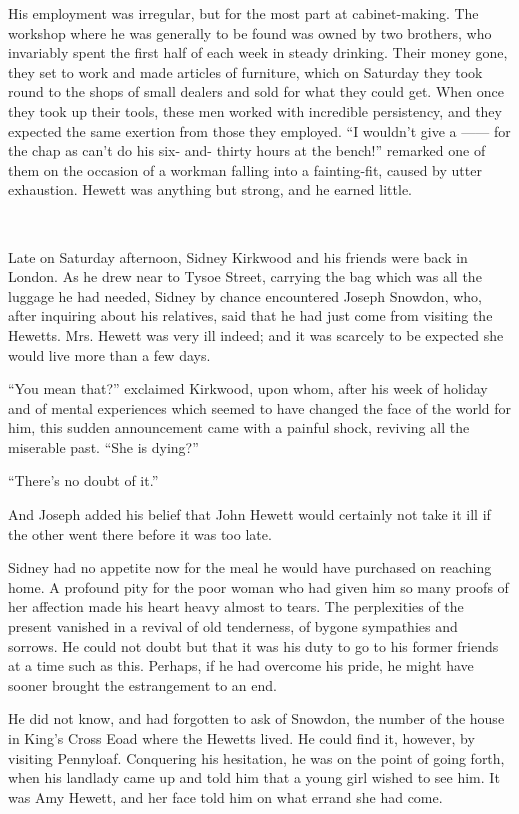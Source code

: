 His employment was irregular, but for the most part at cabinet-making.
The workshop where he was generally to be found was owned by two
brothers, who invariably spent the first half of each week in steady
drinking. Their money gone, they set to work and made articles of
furniture, which on Saturday they took round to the shops of small
dealers {\protect\hypertarget{164}{}{}}and sold for what they could get.
When once they took up their tools, these men worked with incredible
persistency, and they expected the same exertion from those they
employed. ``I wouldn't give {a {{------}}} for the chap as can't do his
six- and- thirty hours at the bench!'' remarked one of them on the
occasion of a workman falling into a fainting-fit, caused by utter
exhaustion. Hewett was anything but strong, and he earned little.

~

Late on Saturday afternoon, Sidney Kirkwood and his friends were back in
London. As he drew near to Tysoe Street, carrying the bag which was all
the luggage he had needed, Sidney by chance encountered Joseph Snowdon,
who, after inquiring about his relatives, said that he had just come
from visiting the Hewetts. Mrs. Hewett was very ill indeed; and it was
scarcely to be expected she would live more than a few days.

``You mean that?'' exclaimed Kirkwood, upon whom, after his week of
holiday and of mental experiences which seemed to have
{\protect\hypertarget{165}{}{}}changed the face of the world for him,
this sudden announcement came with a painful shock, reviving all the
miserable past. ``She is dying?''

``There's no doubt of it.''

And Joseph added his belief that John Hewett would certainly not take it
ill if the other went there before it was too late.

Sidney had no appetite now for the meal he would have purchased on
reaching home. A profound pity for the poor woman who had given him so
many proofs of her affection made his heart heavy almost to tears. The
perplexities of the present vanished in a revival of old tenderness, of
bygone sympathies and sorrows. He could not doubt but that it was his
duty to go to his former friends at a time such as this. Perhaps, if he
had overcome his pride, he might have sooner brought the estrangement to
an end.

He did not know, and had forgotten to ask of Snowdon, the number of the
house in King's Cross Eoad where the Hewetts lived. He could find it,
however, by visiting {\protect\hypertarget{166}{}{}}Pennyloaf.
Conquering his hesitation, he was on the point of going forth, when his
landlady came up and told him that a young girl wished to see him. It
was Amy Hewett, and her face told him on what errand she had come.


